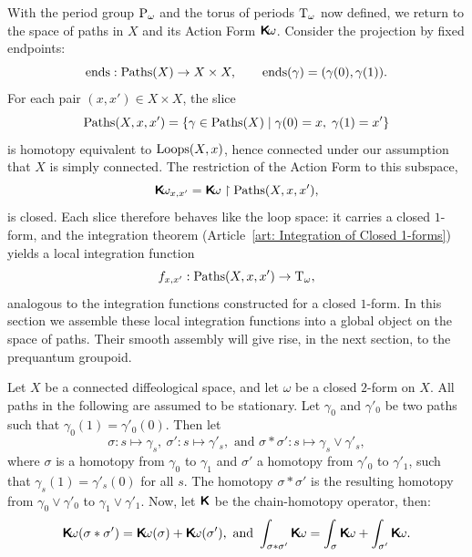 \documentclass[10pt,reqno,letterpaper,twoside]{amsbook}
\begin{document}
  With the period group $\operatorname{P}_\omega$ and the torus of periods $\mathrm{T}_\omega$ now defined,
  we return to the space of paths in $X$ and its Action Form $\boldsymbol{\mathsf{K}}\!\omega$.
  Consider the projection by fixed endpoints:
  \[
    \operatorname{ends}: \operatorname{Paths}(X) \to X \times X,
    \qquad
    \operatorname{ends}(\gamma) = (\gamma(0),\gamma(1)).
    \]%
  For each pair $(x,x') \in X \times X$,
  the slice
  \[
    \operatorname{Paths}(X,x,x') = \{ \gamma \in \operatorname{Paths}(X) \mid \gamma(0) = x,\; \gamma(1) = x' \}
    \]%
  is homotopy equivalent to $\operatorname{Loops}(X,x)$,
  hence connected under our assumption that $X$ is simply connected.
  The restriction of the Action Form to this subspace,
  \[
    \boldsymbol{\mathsf{K}}\!\omega_{x,x'} = \boldsymbol{\mathsf{K}}\!\omega \restriction \operatorname{Paths}(X,x,x'),
    \]%
  is closed.
  Each slice therefore behaves like the loop space:
  it carries a closed $1$-form,
  and the integration theorem
  (Article~\ref{art: Integration of Closed 1-forms})
  yields a local integration function
  \[
    f_{x,x'}: \operatorname{Paths}(X,x,x') \to \mathrm{T}_\omega,
    \]%
  analogous to the integration functions constructed for a closed $1$-form.
  In this section we assemble these local integration functions
  into a global object on the space of paths.
  Their smooth assembly will give rise,
  in the next section,
  to the prequantum groupoid.
  
  \begin{article}
    \label{art:Integrating Concatenations over Homotopies}
    Let $X$ be a connected diffeological space,
    and let $\omega$ be a closed $2$-form on $X$.
    All paths in the following are assumed to be stationary.
    Let $\gamma_0$ and $\gamma'_0$ be two paths such that $\gamma_0(1) = \gamma'_0(0)$.
    Then let
    $$
      \sigma : s \mapsto \gamma_s, \
      \sigma' : s \mapsto \gamma'_s,
      \text{ and } \sigma*\sigma' : s \mapsto \gamma_s \vee \gamma'_s,
      $$
    where $\sigma$ is a homotopy from $\gamma_0$ to $\gamma_1$ and $\sigma'$ a homotopy from $\gamma'_0$ to $\gamma'_1$,
    such that $\gamma_s(1) = \gamma'_s(0)$ for all $s$.
    The homotopy $\sigma*\sigma'$ is the resulting homotopy from $\gamma_0 \vee \gamma'_0$ to $\gamma_1 \vee \gamma'_1$.
    Now,
    let $\boldsymbol{\mathsf{K}}$ be the chain-homotopy operator,
    then:
    $$
      \boldsymbol{\mathsf{K}}\!\omega(\sigma * \sigma') = \boldsymbol{\mathsf{K}}\!\omega(\sigma) + \boldsymbol{\mathsf{K}}\!\omega(\sigma'),
      \ \text{and}\ 
      \int_{\sigma * \sigma'} \boldsymbol{\mathsf{K}}\!\omega = \int_\sigma \boldsymbol{\mathsf{K}}\!\omega + \int_{\sigma'} \boldsymbol{\mathsf{K}}\!\omega.
      $$
  \end{article} %
  
\end{document}
